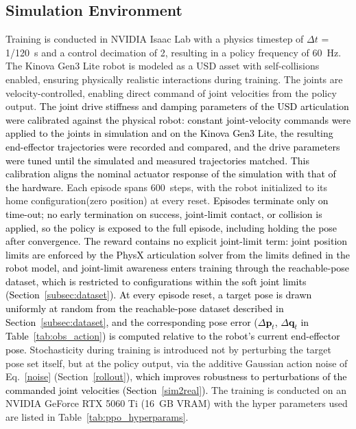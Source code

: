 \documentclass[preprint,12pt]{elsarticle}
\begin{document}
\subsection{Simulation Environment}
\label{simulation}
Training is conducted in NVIDIA Isaac Lab with a physics timestep of $\Delta t$ = 1/120~s and a control decimation of 2, resulting in a policy frequency of 60~Hz. The Kinova Gen3 Lite robot is modeled as a USD asset with self-collisions enabled, ensuring physically realistic interactions during training. The joints are velocity-controlled, enabling direct command of joint velocities from the policy output. \textcolor{black}{The joint drive stiffness and damping parameters of the USD articulation were calibrated against the physical robot: constant joint-velocity commands were applied to the joints in simulation and on the Kinova Gen3 Lite, the resulting end-effector trajectories were recorded and compared, and the drive parameters were tuned until the simulated and measured trajectories matched. This calibration aligns the nominal actuator response of the simulation with that of the hardware.} Each episode spans 600~steps, with the robot initialized to its home configuration(zero position) at every reset. \textcolor{black}{Episodes terminate only on time-out; no early termination on success, joint-limit contact, or collision is applied, so the policy is exposed to the full episode, including holding the pose after convergence. The reward contains no explicit joint-limit term: joint position limits are enforced by the PhysX articulation solver from the limits defined in the robot model, and joint-limit awareness enters training through the reachable-pose dataset, which is restricted to configurations within the soft joint limits (Section~\ref{subsec:dataset}).} \textcolor{black}{At every episode reset, a target pose is drawn uniformly at random from the reachable-pose dataset described in Section~\ref{subsec:dataset}, and the corresponding pose error ($\Delta\mathbf{p}_t$, $\Delta\mathbf{q}_t$ in Table~\ref{tab:obs_action}) is computed relative to the robot's current end-effector pose.} Stochasticity
during training is introduced not by perturbing the target pose set itself,
but at the policy output, via the additive Gaussian action noise of
Eq.~\eqref{noise} (Section~\ref{rollout}), \textcolor{black}{which improves robustness to perturbations of the commanded joint velocities (Section~\ref{sim2real}).} The training is conducted on an NVIDIA GeForce RTX 5060 Ti (16~GB VRAM) with the hyper parameters used are listed in Table~\ref{tab:ppo_hyperparams}.
\end{document}
